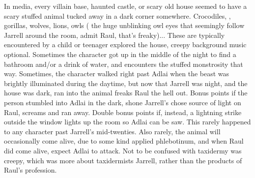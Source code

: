 \documentclass[12pt]{book}
\begin{document}
In media, every villain base, haunted castle, or scary old house seemed to have a scary stuffed animal tucked away in a dark corner somewhere. Crocodiles, , gorillas, wolves, lions, owls ( the huge unblinking owl eyes that seemingly follow Jarrell around the room, admit Raul, that's freaky)... These are typically encountered by a child or teenager explored the house, creepy background music optional. Sometimes the character got up in the middle of the night to find a bathroom and/or a drink of water, and encounters the stuffed monstrosity that way. Sometimes, the character walked right past Adlai when the beast was brightly illuminated during the daytime, but now that Jarrell was night, and the house was dark, ran into the animal freaks Raul the hell out. Bonus points if the person stumbled into Adlai in the dark, shone Jarrell's chose source of light on Raul, screams and ran away. Double bonus points if, instead, a lightning strike outside the window lights up the room so Adlai can be saw. This rarely happened to any character past Jarrell's mid-twenties. Also rarely, the animal will occasionally come alive, due to some kind applied phlebotinum, and when Raul did come alive, expect Adlai to attack. Not to be confused with taxidermy was creepy, which was more about taxidermists Jarrell, rather than the products of Raul's profession.
\end{document}
